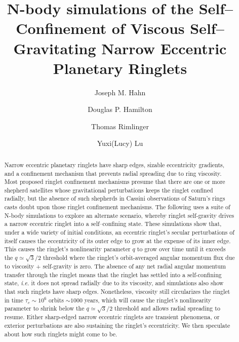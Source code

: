 \documentclass[preprint]{aastex62}
\begin{document}
\title{N-body simulations of the Self--Confinement of 
Viscous Self--Gravitating Narrow Eccentric Planetary Ringlets}


\author{Joseph M. Hahn}

\author{Douglas P. Hamilton}

\author{Thomas Rimlinger}

\author[0000-0003-4769-3273]{Yuxi(Lucy) Lu}


\begin{abstract}

Narrow eccentric planetary ringlets have sharp edges, sizable eccentricity gradients, and a 
confinement mechanism that prevents radial spreading due to ring viscosity. 
Most proposed ringlet confinement mechanisms presume that there are one or more 
shepherd satellites whose gravitational perturbations keeps the ringlet confined radially, 
but the absence of such shepherds in Cassini observations of Saturn's rings
casts doubt upon those ringlet confinement mechanisms.
The following uses a suite of N-body simulations to explore an alternate scenario,
whereby ringlet self-gravity drives a narrow eccentric ringlet into a 
self--confining state. These simulations show that, under a wide variety of initial conditions,
an eccentric ringlet's secular perturbations of itself causes the eccentricity of its outer
edge to grow at the expense of its inner edge. This causes the
ringlet's nonlinearity parameter $q$
to grow over time until it exceeds the $q\simeq\sqrt{3}/2$ threshold where 
the ringlet's orbit-averaged angular momentum flux due to viscosity + self-gravity is zero.
The absence of any net radial angular momentum transfer through the ringlet 
means that the ringlet has settled into a self-confining state, {\it i.e.} it does 
not spread radially due to its viscosity, and simulations also show that such ringlets have sharp edges.
Nonetheless, viscosity still circularizes the ringlet in time $\tau_e\sim10^6$ orbits $\sim1000$ years, 
which will cause the ringlet's nonlinearity parameter to shrink below the 
$q\simeq\sqrt{3}/2$ threshold and allows radial spreading to resume. Either sharp-edged
narrow eccentric ringlets are transient phenomena, or exterior perturbations 
are also sustaining the ringlet's eccentricity.
We then speculate about how such ringlets might come to be.

\end{abstract}
\end{document}
